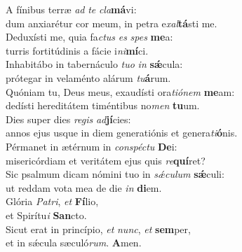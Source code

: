 \evenverse A fínibus terræ \textit{ad} \textit{te} \textit{cla}\textbf{má}vi:~\*\\
\evenverse dum anxiarétur cor meum, in petra e\textit{xal}\textbf{tá}sti me.\\
\oddverse Deduxísti me, quia fa\textit{ctus} \textit{es} \textit{spes} \textbf{me}a:~\*\\
\oddverse turris fortitúdinis a fácie i\textit{ni}\textbf{mí}ci.\\
\evenverse Inhabitábo in tabernáculo \textit{tu}\textit{o} \textit{in} \textbf{sǽ}cula:~\*\\
\evenverse prótegar in velaménto alárum \textit{tu}\textbf{á}rum.\\
\oddverse Quóniam tu, Deus meus, exaudísti ora\textit{ti}\textit{ó}\textit{nem} \textbf{me}am:~\*\\
\oddverse dedísti hereditátem timéntibus no\textit{men} \textbf{tu}um.\\
\evenverse Dies super dies \textit{re}\textit{gis} \textit{ad}\textbf{jí}cies:~\*\\
\evenverse annos ejus usque in diem generatiónis et genera\textit{ti}\textbf{ó}nis.\\
\oddverse Pérmanet in ætérnum in \textit{con}\textit{spé}\textit{ctu} \textbf{De}i:~\*\\
\oddverse misericórdiam et veritátem ejus quis \textit{re}\textbf{quí}ret?\\
\evenverse Sic psalmum dicam nómini tuo in \textit{sǽ}\textit{cu}\textit{lum} \textbf{sǽ}culi:~\*\\
\evenverse ut reddam vota mea de die \textit{in} \textbf{di}em.\\
\oddverse Glória \textit{Pa}\textit{tri}, \textit{et} \textbf{Fí}lio,~\*\\
\oddverse et Spirítu\textit{i} \textbf{San}cto.\\
\evenverse Sicut erat in princípio, \textit{et} \textit{nunc}, \textit{et} \textbf{sem}per,~\*\\
\evenverse et in sǽcula sæculó\textit{rum}. \textbf{A}men.\\
